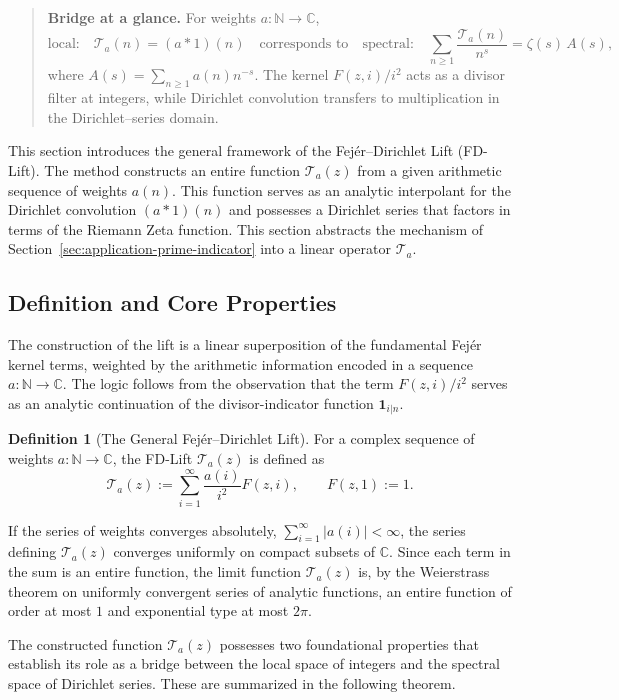 \documentclass[11pt,a4paper]{amsart}
\newcommand{\C}{\mathbb{C}}
\newcommand{\N}{\mathbb{N}}
\theoremstyle{plain}
\theoremstyle{definition}
\newtheorem{definition}[theorem]{Definition}
\theoremstyle{remark}
\begin{document}
\begin{quote}\small
\textbf{Bridge at a glance.} For weights $a:\mathbb N\to\mathbb C$,
\[
\text{local:}\quad \mathcal T_a(n)=(a*1)(n)
\quad \text{corresponds to} \quad
\text{spectral:}\quad \sum_{n\ge1}\frac{\mathcal T_a(n)}{n^s}=\zeta(s)\,A(s),
\]
where $A(s)=\sum_{n\ge1}a(n)n^{-s}$. The kernel $F(z,i)/i^2$ acts as a divisor filter at integers, while Dirichlet convolution transfers to multiplication in the Dirichlet–series domain.
\end{quote}

This section introduces the general framework of the Fej\'er--Dirichlet Lift (FD-Lift). The method constructs an entire function $\mathcal{T}_a(z)$ from a given arithmetic sequence of weights $a(n)$. This function serves as an analytic interpolant for the Dirichlet convolution $(a*1)(n)$ and possesses a Dirichlet series that factors in terms of the Riemann Zeta function.
This section abstracts the mechanism of Section~\ref{sec:application-prime-indicator} into a linear operator $\mathcal{T}_a$.

\subsection{Definition and Core Properties}

The construction of the lift is a linear superposition of the fundamental Fej\'er kernel terms, weighted by the arithmetic information encoded in a sequence $a:\N \to \C$. The logic follows from the observation that the term $F(z,i)/i^2$ serves as an analytic continuation of the divisor-indicator function $\mathbf{1}_{i|n}$.

\begin{definition}[The General Fej\'er--Dirichlet Lift]
For a complex sequence of weights $a:\N \to \C$, the FD-Lift $\mathcal{T}_a(z)$ is defined as
\[
\mathcal{T}_a(z) := \sum_{i=1}^{\infty} \frac{a(i)}{i^2} F(z,i),\qquad F(z,1):=1.
\]
\end{definition}

If the series of weights converges absolutely, $\sum_{i=1}^{\infty} |a(i)| < \infty$, the series defining $\mathcal{T}_a(z)$ converges uniformly on compact subsets of $\C$. Since each term in the sum is an entire function, the limit function $\mathcal{T}_a(z)$ is, by the Weierstrass theorem on uniformly convergent series of analytic functions, an entire function of order at most $1$ and exponential type at most $2\pi$.

The constructed function $\mathcal{T}_a(z)$ possesses two foundational properties that establish its role as a bridge between the local space of integers and the spectral space of Dirichlet series. These are summarized in the following theorem.
\end{document}
